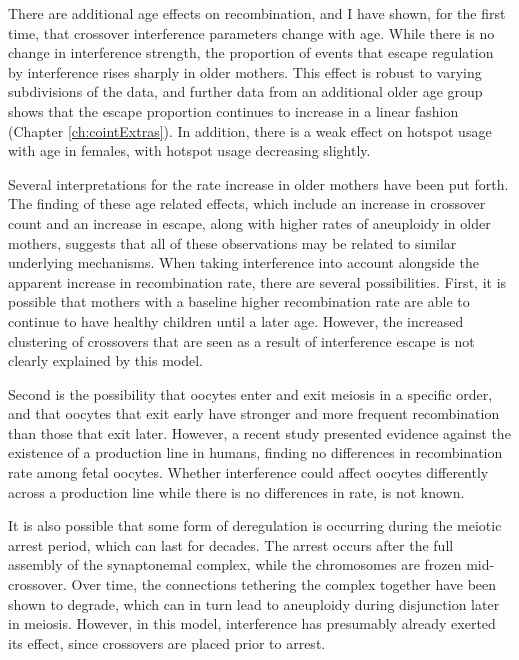 There are additional age effects on recombination, and 
I have shown, for the first time, that crossover interference parameters change with age.
While there is no change in interference strength, the proportion of events that escape regulation by interference rises sharply in older mothers.
This effect is robust to varying subdivisions of the data, and further data from an additional older age group shows that the escape proportion continues to increase in a linear fashion (Chapter \ref{ch:cointExtras}).
In addition, there is a weak effect on hotspot usage with age in females, with hotspot usage decreasing slightly.


Several interpretations for the rate increase in older mothers have been put forth.
The finding of these age related effects, which include an increase in crossover count and an increase in escape, along with higher rates of aneuploidy in older mothers\cite{Hassold2001}, suggests that all of these observations may be related to similar underlying mechanisms.
When taking interference into account alongside the apparent increase in recombination rate, there are several possibilities.
First, it is possible that mothers with a baseline higher recombination rate are able to continue to have healthy children until a later age\cite{Kong2004}.
However, the increased clustering of crossovers that are seen as a result of interference escape is not clearly explained by this model.

Second is the possibility that oocytes enter and exit meiosis in a specific order, and that oocytes that exit early have stronger and more frequent recombination than those that exit later.
However, a recent study presented evidence against the existence of a production line in humans, finding no differences in recombination rate among fetal oocytes\cite{Rowsey2014}.
Whether interference could affect oocytes differently across a production line while there is no differences in rate, is not known.

It is also possible that some form of deregulation is occurring during the meiotic arrest period, which can last for decades.
The arrest occurs after the full assembly of the synaptonemal complex, while the chromosomes are frozen mid-crossover.
Over time, the connections tethering the complex together have been shown to degrade\cite{Nagaoka2012}, which can in turn lead to aneuploidy during disjunction later in meiosis.
However, in this model, interference has presumably already exerted its effect, since crossovers are placed prior to arrest.

